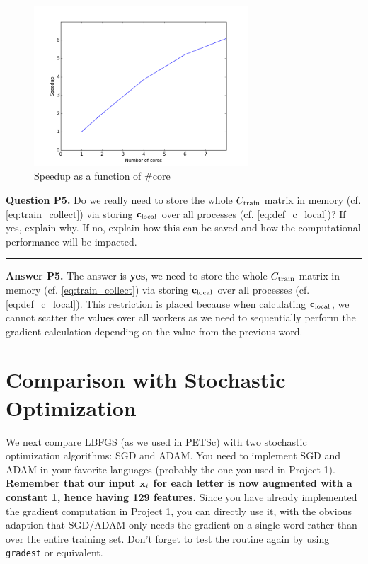 \documentclass[11pt]{report}
\begin{document}
\begin{figure}
\centering
\includegraphics[width=8cm]{q4}
\caption{Speedup as a function of \#core}
\label{fig:scalability}
\end{figure}

{\bf Question P5.}
Do we really need to store the whole ${C_{\text{train}}}$ matrix in memory (cf. \eqref{eq:train_collect}) via storing $\mathbf{\boldsymbol{c}}_{\text{local}}$ over all processes (cf. \eqref{eq:def_c_local})?
If yes, explain why.
If no, explain how this can be saved and how the computational performance will be impacted.

\rule{\paperwidth}{0.6pt}
{\bf Answer P5.} The answer is \textbf{yes}, we need to store the whole ${C_{\text{train}}}$ matrix in memory (cf. \eqref{eq:train_collect}) via storing $\mathbf{\boldsymbol{c}}_{\text{local}}$ over all processes (cf. \eqref{eq:def_c_local}). This restriction is placed because when calculating $\mathbf{\boldsymbol{c}}_{\text{local}}$, we cannot scatter the values over all workers as we need to sequentially perform the gradient calculation depending on the value from the previous word.

\section{Comparison with Stochastic Optimization}

We next compare LBFGS (as we used in PETSc) with two stochastic optimization algorithms: SGD and ADAM.
You need to implement SGD and ADAM in your favorite languages (probably the one you used in Project 1).
{\bf Remember that our input $\mathbf{\boldsymbol{x}}_i$ for each letter is now augmented with a constant 1, hence having 129 features.}
Since you have already implemented the gradient computation in Project 1, 
you can directly use it,
with the obvious adaption that SGD/ADAM only needs the gradient on a single word rather than over the entire training set.
Don't forget to test the routine again by using \verb#gradest# or equivalent.
\end{document}
